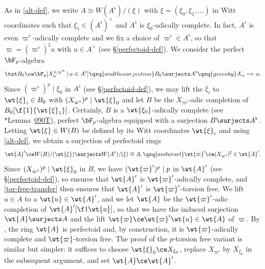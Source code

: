 \bpf
As in \eqref{alt-def}, we write $A \cong W(A^\flat)/(\xi)$ with $\xi = (\xi_0, \xi_1, \dotsc)$ in Witt coordinates such that $\xi_1 \in (A^\flat)^\times$ and $A^\flat$ is $\xi_0$-adically complete. In fact, $A^\flat$ is even $\varpi^\flat$-adically complete and we fix a choice of $\varpi^\flat \in A^\flat$, so that $\varpi = (\varpi^\flat)^\sharp u $ with $u \in A^\times$ (see \S\ref{perfectoid-def}).
We consider the perfect $\bF_p$-algebra
\[
\tst B_0 \ce \bF_p[X_a^{1/p^\infty}\, \vert\, a \in A^\flat] \qxq{and the surjection} B_0 \surjects A^\flat \qxq{given by} %
X_a\, \mapsto\, a.
\]
Since $(\varpi^\flat)^p \mid \xi_0$ in $A^\flat$ (see \S\ref{perfectoid-def}), we may lift the $\xi_i$ to $\wt{\xi}_i \in B_0$ with $(X_{\varpi^\flat})^p \mid \wt{\xi}_0$
and let $B$ be the $X_{\varpi^\flat}$-adic completion of $B_0[\f{1}{\wt{\xi}_1}]$. Certainly, $B$ is a $\wt{\xi_0}$-adically complete (see \cite{SP}*{Lemma~\href{https://stacks.math.columbia.edu/tag/090T}{090T}}), perfect $\bF_p$-algebra equipped with a surjection $B \surjects A^\flat$. Letting $\wt{\xi} \in W(B)$ be defined by its Witt coordinates $\wt{\xi}_i$ and using \eqref{alt-def}, we obtain a surjection of perfectoid rings %
\[
\wt{A}' \ce W(B)/(\wt{\xi}) \surjects W(A^\flat)/(\xi) \cong A, \qxq{and we set} \wt{\varpi}' \ce (X_{\varpi^\flat})^\sharp \in \wt{A}'.
\]
Since $(X_{\varpi^\flat})^p \mid \wt{\xi}_0$ in $B$, we have $(\wt{\varpi}')^p \mid p$ in $\wt{A}'$ (see \S\ref{perfectoid-def}), so  ensures that $\wt{A}'$ is $\wt{\varpi}'$-adically complete, and \eqref{tor-free-transfer}  then  ensures that $\wt{A}'$ is $\wt{\varpi}'$-torsion free. We lift $u \in A$ to a $\wt{u} \in \wt{A}'$, and we let $\wt{A}$ be the $\wt{\varpi}'$-adic completion  of $\wt{A}'[\f 1{\wt{u}}]$, so that we have the induced surjection $\wt{A} \surjects A$ and the lift $\wt{\varpi} \ce \wt{\varpi}' \wt{u} \in \wt{A}$ of $\varpi$. By , the ring $\wt{A}$ is perfectoid and, by construction, it is $\wt{\varpi}$-adically complete and $\wt{\varpi}$-torsion free. The proof of the $p$-torsion free variant %
is similar but simpler: it suffices to choose $\wt{\xi}_0 \ce X_{\xi_0}$, replace $X_{\varpi^\flat}$ by $X_{\xi_0}$ in the subsequent argument, and set $\wt{A} \ce \wt{A}'$.
\epf













